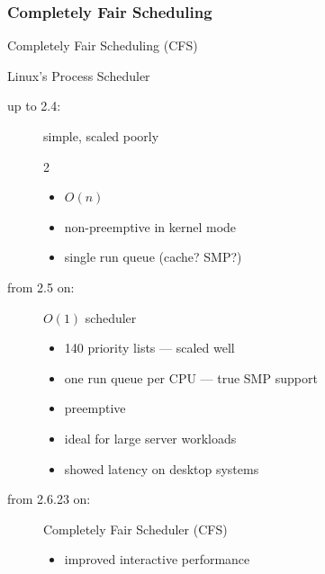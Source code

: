 \subsubsection{Completely Fair Scheduling}
\label{sec:compl-fair-sched}

\begin{frame}{Completely Fair Scheduling (CFS)}
  \begin{block}{Linux's Process Scheduler}
    \begin{description}
    \item[up to 2.4:] simple, scaled poorly
      \begin{multicols}{2}
        \begin{itemize}
        \item $O(n)$
        \item non-preemptive in kernel mode
        \item single run queue (cache? SMP?)
        \end{itemize}
      \end{multicols}
    \item[from 2.5 on:] $O(1)$ scheduler
      \begin{itemize}
      \item[🙂] 140 priority lists --- scaled well
      \item[🙂] one run queue per CPU --- true SMP support
      \item[🙂] preemptive
      \item[🙂] ideal for large server workloads
      \item[\textcolor{red}{🙁}] showed latency on desktop systems
      \end{itemize}
    \item[from 2.6.23 on:] Completely Fair Scheduler (CFS)
      \begin{itemize}
      \item[🙂] improved interactive performance
      \end{itemize}
    \end{description}
  \end{block}
\end{frame}


